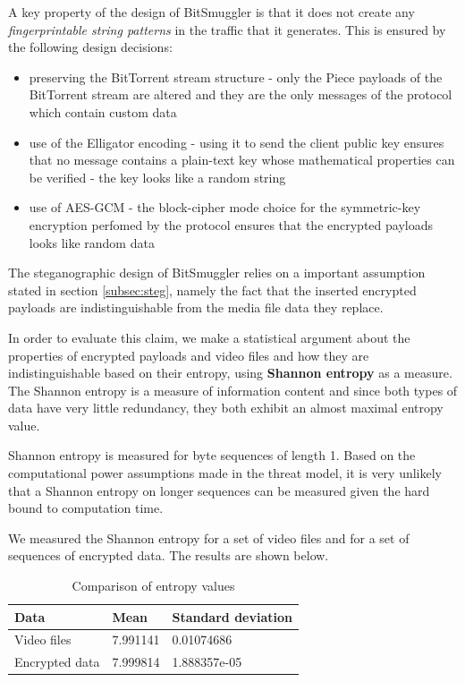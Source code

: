 \documentclass[11pt]{book} %
\newcommand{\projectName}{BitSmuggler }
\begin{document}
A key property of the design of \projectName is that it does not create any \textit{fingerprintable string patterns} in the traffic that it generates. This is ensured by the following design decisions:
\begin{itemize}
\item preserving the BitTorrent stream structure - only the Piece payloads of the BitTorrent stream are altered and they are the only messages of the protocol which contain custom data
\item use of the Elligator encoding - using it to send the client public key ensures that no message contains a plain-text key whose mathematical properties can be verified - the key looks like a random string
\item use of AES-GCM - the block-cipher mode choice for the symmetric-key encryption perfomed by the protocol ensures that the encrypted payloads looks like random data
\end{itemize}

The steganographic design of \projectName relies on a important assumption stated in section \ref{subsec:steg}, namely the fact that the inserted encrypted payloads are indistinguishable from the media file data they replace.

In order to evaluate this claim, we make a statistical argument about the properties of encrypted payloads and video files and how they are indistinguishable based on their entropy, using \textbf{Shannon entropy} as a measure. The Shannon entropy is a measure of information content and since both types of data have very little redundancy, they both exhibit an almost maximal entropy value.

Shannon entropy is measured for byte sequences of length 1. Based on the computational power assumptions made in the threat model, it is very unlikely that a Shannon entropy on longer sequences can be measured  given the hard bound to computation time.

We measured the Shannon entropy for a set of video files and for a set of sequences of encrypted data. The results are shown below.

\begin{table}
    \begin{tabular}{|l|l|l|}
    \hline
    Data           & Mean     & Standard deviation \\ \hline
    Video files    & 7.991141 & 0.01074686         \\ \hline
    Encrypted data & 7.999814 & 1.888357e-05       \\ \hline
    \end{tabular}
    \caption{Comparison of entropy values}
\end{table}
\end{document}
